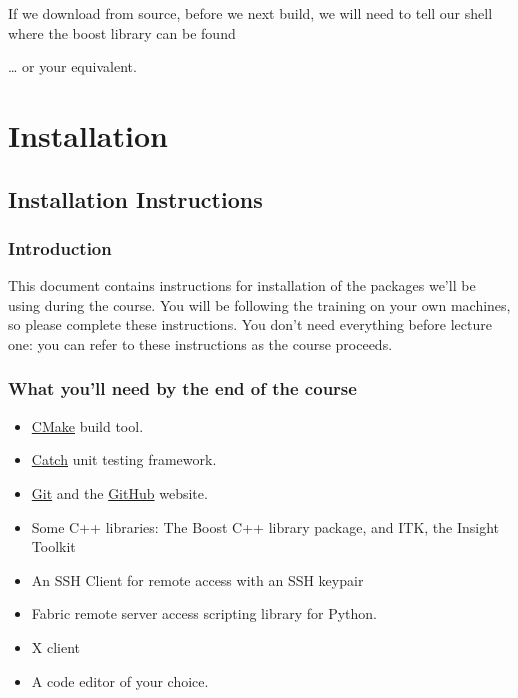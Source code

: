 If we download from source, before we next build, we will need to tell
our shell where the boost library can be found

\begin{Shaded}
\begin{Highlighting}[]
 
 
 
\end{Highlighting}
\end{Shaded}

\ldots{} or your equivalent.

\section{Installation}\label{installation}

\subsection{Installation Instructions}\label{installation-instructions}

\subsubsection{Introduction}\label{introduction-5}

This document contains instructions for installation of the packages
we'll be using during the course. You will be following the training on
your own machines, so please complete these instructions. You don't need
everything before lecture one: you can refer to these instructions as
the course proceeds.

\subsubsection{What you'll need by the end of the
course}\label{what-youll-need-by-the-end-of-the-course}

\begin{itemize}
\itemsep1pt\parskip0pt
\item
  \href{http://www.cmake.org}{CMake} build tool.
\item
  \href{https://github.com/philsquared/Catch}{Catch} unit testing
  framework.
\item
  \href{https://git-scm.com/}{Git} and the
  \href{https://github.com/}{GitHub} website.
\item
  Some C++ libraries: The Boost C++ library package, and ITK, the
  Insight Toolkit
\item
  An SSH Client for remote access with an SSH keypair
\item
  Fabric remote server access scripting library for Python.
\item
  X client
\item
  A code editor of your choice.
\end{itemize}

